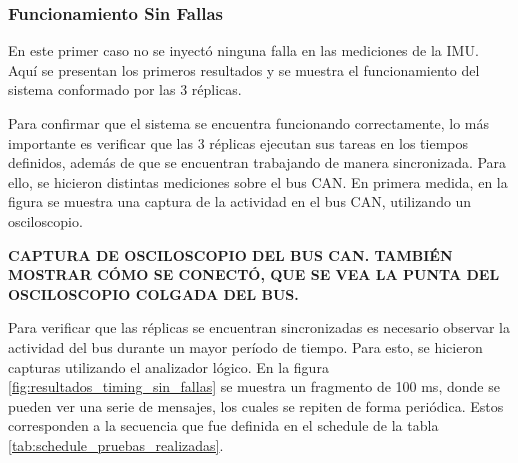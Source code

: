\subsubsection{Funcionamiento Sin Fallas}


En este primer caso no se inyectó ninguna falla en las mediciones de la IMU. Aquí se presentan los primeros resultados y se muestra el funcionamiento del sistema conformado por las 3 réplicas.

Para confirmar que el sistema se encuentra funcionando correctamente, lo más importante es verificar que las 3 réplicas ejecutan sus tareas en los tiempos definidos, además de que se encuentran trabajando de manera sincronizada. Para ello, se hicieron distintas mediciones sobre el bus CAN. En primera medida, en la figura  se muestra una captura de la actividad en el bus CAN, utilizando un osciloscopio.

{\Large \textbf{{\color{red} CAPTURA DE OSCILOSCOPIO DEL BUS CAN. TAMBIÉN MOSTRAR CÓMO SE CONECTÓ, QUE SE VEA LA PUNTA DEL OSCILOSCOPIO COLGADA DEL BUS.}}}

Para verificar que las réplicas se encuentran sincronizadas es necesario observar la actividad del bus durante un mayor período de tiempo. Para esto, se hicieron capturas utilizando el analizador lógico. En la figura \ref{fig:resultados_timing_sin_fallas} se muestra un fragmento de 100 ms, donde se pueden ver una serie de mensajes, los cuales se repiten de forma periódica. Estos corresponden a la secuencia que fue definida en el schedule de la tabla \ref{tab:schedule_pruebas_realizadas}.


